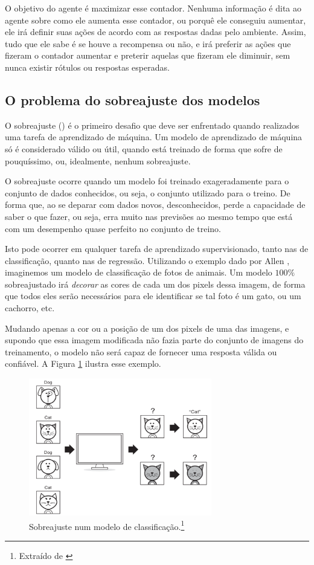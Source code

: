 O objetivo do agente é maximizar esse contador. Nenhuma informação é dita ao agente sobre como ele aumenta esse contador, ou porquê ele conseguiu aumentar, ele irá definir suas ações de acordo com as respostas dadas pelo ambiente. Assim, tudo que ele sabe é se houve a recompensa ou não, e irá preferir as ações que fizeram o contador aumentar e preterir aquelas que fizeram ele diminuir, sem nunca existir rótulos ou respostas esperadas.

\subsection{O problema do sobreajuste dos modelos}

O sobreajuste () é o primeiro desafio que deve ser enfrentado quando realizados uma tarefa de aprendizado de máquina. Um modelo de aprendizado de máquina só é considerado válido ou útil, quando está treinado de forma que sofre de pouquíssimo, ou, idealmente, nenhum sobreajuste.

O sobreajuste ocorre quando um modelo foi treinado exageradamente para o conjunto de dados conhecidos, ou seja, o conjunto utilizado para o treino. De forma que, ao se deparar com dados novos, desconhecidos, perde a capacidade de saber o que fazer, ou seja, erra muito nas previsões ao mesmo tempo que está com um desempenho quase perfeito no conjunto de treino. 

Isto pode ocorrer em qualquer tarefa de aprendizado supervisionado, tanto nas de classificação, quanto nas de regressão. Utilizando o exemplo dado por Allen \citep{allen}, imaginemos um modelo de classificação de fotos de animais. Um modelo $100\%$ sobreajustado irá \emph{decorar} as cores de cada um dos pixels dessa imagem, de forma que todos eles serão necessários para ele identificar se tal foto é um gato, ou um cachorro, etc.

Mudando apenas a cor ou a posição de um dos pixels de uma das imagens, e supondo que essa imagem modificada não fazia parte do conjunto de imagens do treinamento, o modelo não será capaz de fornecer uma resposta válida ou confiável. A Figura \ref{fig:over_class} ilustra esse exemplo.

\begin{figure}[htb]
\centering
\includegraphics[width=8cm]{figuras/over_class}
\caption{Sobreajuste num modelo de classificação.\footnote{Extraído de \citep{allen}}}
\label{fig:over_class}
\end{figure}

